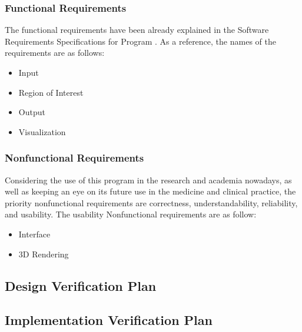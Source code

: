 \documentclass[12pt, titlepage]{article}
\begin{document}
\subsubsection{Functional Requirements}
The functional requirements have been already explained in the Software Requirements Specifications for Program \progname{}. As a reference, the names of the requirements are as follows:
\begin{itemize}
\item {Input}
\item {Region of Interest}
\item {Output}
\item {Visualization}
\end{itemize} 


\subsubsection{Nonfunctional Requirements}
Considering the use of this program in the research and academia nowadays, as well as keeping an eye on its future use in the medicine and clinical practice, the priority nonfunctional
requirements are correctness, understandability, reliability, and usability. The usability Nonfunctional requirements are as follow:
\begin{itemize}
\item {Interface}
\item {3D Rendering}
\end{itemize} 




\subsection{Design Verification Plan}




\subsection{Implementation Verification Plan}
\end{document}
